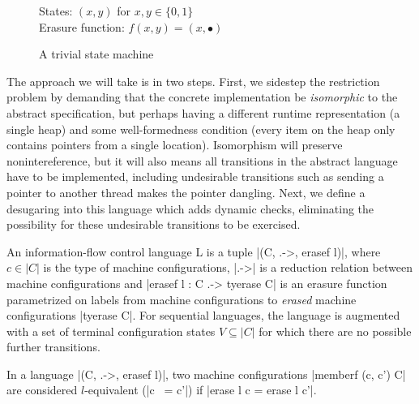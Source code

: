 \begin{figure}
    States: $(x,y)$ for $x,y \in \{0,1\}$ \\
    Erasure function: $f(x,y) = (x,\bullet)$

    \begin{center}\end{center}

    \label{fig:trivial-sm}
    \caption{A trivial state machine}
\end{figure}

The approach we will take is in two steps.  First, we sidestep the
restriction problem by demanding that the concrete implementation be
\emph{isomorphic} to the abstract specification, but perhaps having a different
runtime representation (a single heap) and some well-formedness
condition (every item on the heap only contains pointers from a single
location).  Isomorphism will preserve nonintereference, but it will also means all
transitions in the abstract language have to be implemented, including
undesirable transitions such as sending a pointer to another thread makes
the pointer dangling.  Next, we define a desugaring into this language
which adds dynamic checks, eliminating the possibility for these undesirable
transitions to be exercised.


\begin{definition}
    An information-flow control language L is a tuple |(C, .->,
    erasef l)|, where $c \in |C|$ is the type of machine configurations, |.->| is a
    reduction relation between machine configurations and |erasef l : C .-> tyerase C|
    is an erasure function parametrized on labels from machine configurations to \emph{erased} machine
    configurations |tyerase C|.  For sequential languages, the
    language is augmented with a set of terminal configuration states $V
    \subseteq |C|$ for which there are no possible further transitions.
\end{definition}

\begin{definition}[$l$-equivalence]
    In a language |(C, .->, erasef l)|, two machine configurations
    |memberf (c, c') C| are considered $l$-equivalent (|c ~= c'|)
    if |erase l c = erase l c'|.
\end{definition}

